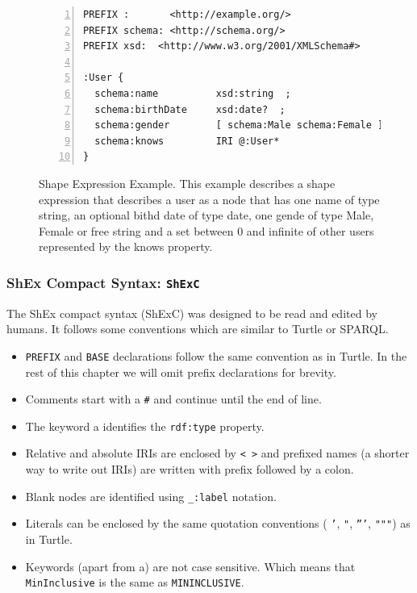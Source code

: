 \begin{figure}
\begin{lstlisting}[numbers=left, basicstyle=\ttfamily\scriptsize]
PREFIX :       <http://example.org/>
PREFIX schema: <http://schema.org/>
PREFIX xsd:  <http://www.w3.org/2001/XMLSchema#>

:User {
  schema:name          xsd:string  ;
  schema:birthDate     xsd:date?  ;
  schema:gender        [ schema:Male schema:Female ] OR xsd:string ;
  schema:knows         IRI @:User*
}
\end{lstlisting}
\caption[Shape Expression Example]{Shape Expression Example. This example describes a shape expression that
describes a user as a node that has one name of type string, an optional bithd date of type date, one gende
of type Male, Female or free string and a set between 0 and infinite of other users represented by the knows
property.}
\label{fig:shape-expr-ex}
\end{figure}

\subsubsection{ShEx Compact Syntax: \texttt{ShExC}}
The ShEx compact syntax (ShExC) was designed to be read and edited by humans. It follows some conventions which
are similar to Turtle or SPARQL.

\begin{itemize}
    \item \texttt{PREFIX} and \texttt{BASE} declarations follow the same convention as in Turtle. In the rest of
    this chapter we will omit prefix declarations for brevity.
	\item Comments start with a \texttt{\#} and continue until the end of line.
	\item The keyword a identifies the \texttt{rdf:type} property.
    \item Relative and absolute IRIs are enclosed by \texttt{< >} and prefixed names (a shorter way to write
    out IRIs) are written with prefix followed by a colon.
	\item Blank nodes are identified using \texttt{\_:label} notation.
    \item Literals can be enclosed by the same quotation conventions ( \texttt{'}, \texttt{"}, \texttt{'''},
    \texttt{"""}) as in Turtle.
    \item Keywords (apart from a) are not case sensitive. Which means that \texttt{MinInclusive} is the same
    as \texttt{MININCLUSIVE}.
\end{itemize}

